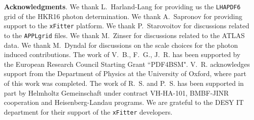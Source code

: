 {\bf Acknowledgments}.
%
We thank L.~Harland-Lang for providing us the {\tt LHAPDF6} grid of
the HKR16 photon determination.
%
We thank A.~Sapronov for providing support to the {\tt xFitter} platform.
%
%
We thank P.~Starovoitov for discussions related to the {\tt APPLgrid} files.
%
We thank M.~Zinser for discussions related to the ATLAS data.
% 
We thank M.~Dyndal for discussions on the scale choices for the photon induced contributions.
%
The work of V.~B., F.~G., J.~R. has been supported by the European
Research Council Starting Grant ``PDF4BSM".
%
V.~R. acknowledges support from the Department of Physics at the University of
Oxford, where part of this work was completed.
%
The work of R.~S. and P.~S. has been supported in part by Helmholtz Gemeinschaft
under contract VH-HA-101, BMBF-JINR cooperation and Heisenberg-Landau programs.
%
We are grateful to the DESY IT department for their support of the {\tt xFitter} developers. 



